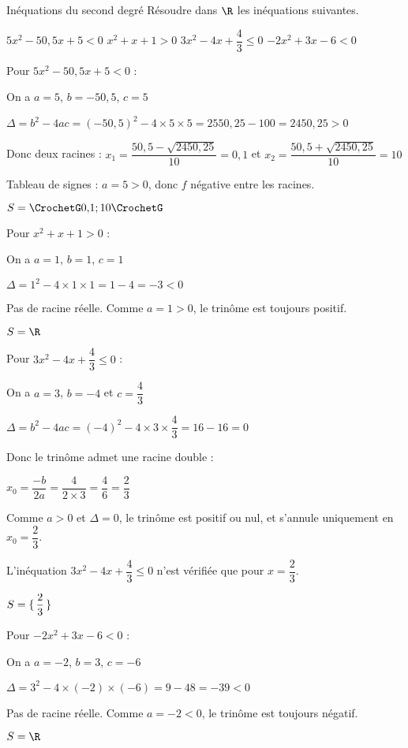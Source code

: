 \vspace{-2mm}
\def\rdifficulty{2}
\begin{EXO}{Inéquations du second degré}{}
Résoudre dans $\R$ les inéquations suivantes.
\vspace{-2mm}
\begin{tcbenumerate}[4]
\tcbitem {} $5x^2-50,5x+5<0$
\tcbitem {} $x^2+x+1>0$
\tcbitem {} $3x^2-4x+\dfrac{4}{3}\leqslant 0$
\tcbitem {} $-2x^2+3x-6<0$\\
\end{tcbenumerate}

\exocorrection

\begin{tcbenumerate}[1]
\tcbitem Pour $5x^2-50,5x+5<0$ :

On a $a=5$, $b=-50{,}5$, $c=5$

$\Delta = b^2-4ac = (-50{,}5)^2-4\times5\times5 = 2550{,}25-100 = 2450{,}25 > 0$

Donc deux racines : $x_1 = \dfrac{50{,}5-\sqrt{2450{,}25}}{10} = 0{,}1$ et $x_2 = \dfrac{50{,}5+\sqrt{2450{,}25}}{10} = 10$

Tableau de signes : $a=5>0$, donc $f$ négative entre les racines.

$S = \CrochetG 0{,}1 ; 10 \CrochetG$

\tcbitem Pour $x^2+x+1>0$ :

On a $a=1$, $b=1$, $c=1$

$\Delta = 1^2-4\times1\times1 = 1-4 = -3 < 0$

Pas de racine réelle. Comme $a=1>0$, le trinôme est toujours positif.

$S = \R$

\tcbitem Pour $3x^2-4x+\dfrac{4}{3}\leqslant 0$ :

On a $a=3$, $b=-4$ et $c=\dfrac{4}{3}$

$\Delta = b^2-4ac = (-4)^2-4\times3\times\dfrac{4}{3} = 16-16 = 0$

Donc le trinôme admet une racine double :

$x_0 = \dfrac{-b}{2a} = \dfrac{4}{2\times3} = \dfrac{4}{6} = \dfrac{2}{3}$

Comme $a>0$ et $\Delta=0$, le trinôme est positif ou nul, et s'annule uniquement en $x_0=\dfrac{2}{3}$.

L'inéquation $3x^2-4x+\dfrac{4}{3}\leqslant 0$ n'est vérifiée que pour $x=\dfrac{2}{3}$.

$S = \ensembleDiscret{\dfrac{2}{3}}$

\tcbitem Pour $-2x^2+3x-6<0$ :

On a $a=-2$, $b=3$, $c=-6$

$\Delta = 3^2-4\times(-2)\times(-6) = 9-48 = -39 < 0$

Pas de racine réelle. Comme $a=-2<0$, le trinôme est toujours négatif.

$S = \R$
\end{tcbenumerate}
\end{EXO}

